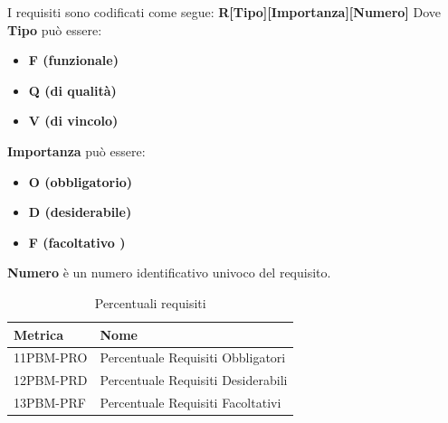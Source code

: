 I requisiti sono codificati come segue: \textbf{R[Tipo][Importanza][Numero]}
\newline
Dove \textbf{Tipo} può essere:
\begin{itemize}
    \item \textbf{F (funzionale)}
    \item \textbf{Q (di qualità)}
    \item \textbf{V (di vincolo)}
\end{itemize}
\textbf{Importanza} può essere:
\begin{itemize}
    \item \textbf{O (obbligatorio)}
    \item \textbf{D (desiderabile)}
    \item \textbf{F (facoltativo )}
\end{itemize}
\textbf{Numero} è un numero identificativo univoco del requisito.
\begin{table}[h!]
    \centering
    \renewcommand{\arraystretch}{1.5}
    \begin{tabular}{|>{\centering\arraybackslash}m{5cm}|>{\centering\arraybackslash}m{5cm}|}
        \hline
        \textbf{Metrica} & \textbf{Nome} \\
        \hline
        11PBM-PRO & Percentuale Requisiti Obbligatori \\
        \hline
        12PBM-PRD & Percentuale Requisiti Desiderabili \\
        \hline
        13PBM-PRF & Percentuale Requisiti Facoltativi \\
        \hline
    \end{tabular}
    \caption{Percentuali requisiti}
    \label{tab:percentuali_requisiti}
\end{table}

